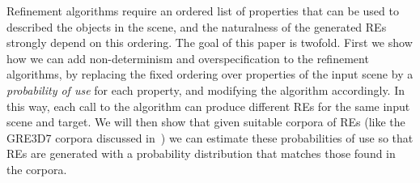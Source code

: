 Refinement algorithms require an 
ordered list of properties that can be used to described the objects in the scene, and the naturalness of the generated REs strongly depend on this ordering. 
The goal of this paper is twofold. First we show how we can add non-determinism and overspecification to the refinement algorithms, by replacing the fixed ordering 
over properties of the input scene by a \emph{probability of use} for each property, and modifying the algorithm accordingly.  
In this way, each call to the algorithm can produce different REs for the same input scene and target.  We will then show that given suitable corpora of REs (like the GRE3D7 corpora discussed in~\cite{viet:gene11}) we can estimate these probabilities of use so that REs are generated with a probability distribution that matches those found in the corpora.  




